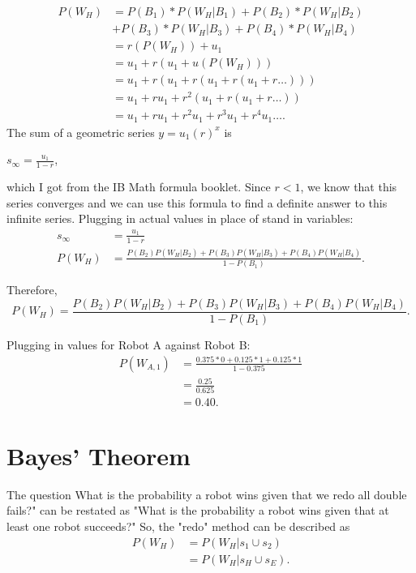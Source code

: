 \documentclass[11pt]{article}
\begin{document}
\begin{align*}
    P(W_H) &= P(B_{1}) * P(W_{H} | B_{1}) + P(B_{2}) * P(W_{H} | B_{2})\\
    &+ P(B_{3}) * P(W_{H} | B_{3}) + P(B_{4}) * P(W_{H} | B_{4})\\
    &= r(P(W_{H})) + u_1\\
    &= u_1 + r(u_1 + u(P(W_{H})))\\
    &= u_1 + r(u_1 + r(u_1 + r(u_1 + r\dots)))\\
    &= u_1 + ru_1 + r^2(u_1 + r(u_1 + r\dots))\\
    &= u_1 + ru_1 + r^2 u_1 + r^3 u_1 + r^4 u_1\dots.
\end{align*}
The sum of a geometric series \(y = u_1 (r)^x \) is

\(s_{\infty} = \frac{u_1}{1-r}\),

which I got from the IB Math formula booklet. Since \(r < 1 \), we know that this
series converges and we can use this formula to find a definite answer to this infinite series.
Plugging in actual values in place of stand in variables:
\begin{align*}
    s_{\infty} &= \frac{u_1}{1-r}\\
    P(W_H) &= \frac{P(B_2)P(W_H | B_2) + P(B_3)P(W_H | B_3) + P(B_4)P(W_H | B_4)}{1-P(B_1)}.
\end{align*}

Therefore,
\begin{equation*}
    P(W_{H}) = \frac{P(B_2)P(W_H | B_2) + P(B_3)P(W_H | B_3) + P(B_4)P(W_H | B_4)}{1-P(B_1)}.
\end{equation*}

Plugging in values for Robot A against Robot B:
\begin{align*}
    P(W_{A,1}) &= \frac{0.375 * 0 + 0.125 * 1 + 0.125 * 1}{1-0.375}\\
    &=\frac{0.25}{0.625}\\
    &=0.40.
\end{align*}


\section{Bayes' Theorem}
The question What is the probability a robot wins given that we redo all double fails?" can be restated as
"What is the probability a robot wins given that at least one robot succeeds?" So, the "redo" method can be
described as 
\begin{align*}
    P(W_H) &= P(W_H | s_1 \cup s_2)\\
    &= P(W_H | s_H \cup s_E).
\end{align*}
\end{document}
